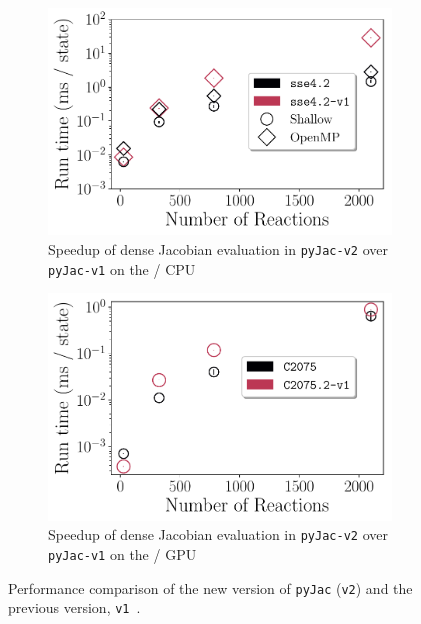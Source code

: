 \documentclass[12pt,number,sort&compress,preprint]{elsarticle}
\begin{document}
\begin{figure}[htbp]
   \centering
  \begin{subfigure}[t]{0.48\linewidth}
      \includegraphics[width=\textwidth]{v1_vs_v2.pdf}
      \caption{Speedup of dense Jacobian evaluation in \texttt{pyJac-v2} over \texttt{pyJac-v1} on the \sse/ CPU}
      \label{F:v1_vs_v2_cpu}
  \end{subfigure}
  \hfill
  \begin{subfigure}[t]{0.48\linewidth}
      \includegraphics[width=\textwidth]{v1_vs_v2_gpu.pdf}
      \caption{Speedup of dense Jacobian evaluation in \texttt{pyJac-v2} over \texttt{pyJac-v1} on the \gpuold/ GPU}
      \label{F:v1_vs_v2_gpu}
  \end{subfigure}
  \caption{Performance comparison of the new version of \texttt{pyJac} (\texttt{v2}) and the previous version, \texttt{v1}~\cite{pyjac16}.}
  \label{F:v1_vs_v2}
\end{figure}
\end{document}
